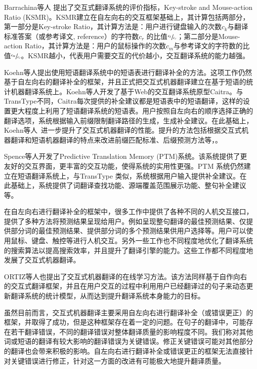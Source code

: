 \documentclass[master, winfont]{njuthesis}
\begin{document}
Barrachina等人\cite{barrachina2009statistical} 提出了交互式翻译系统的评价指标，Key-stroke and Mouse-action Ratio (KSMR)。KSMR建立在自左向右的交互框架基础上，其计算包括两部分，第一部分是Key-stroke Ratio，其计算方法是：用户进行键盘输入的次数$c_k$与翻译标准答案（或参考译文, reference）的字符数$c_r$ 的比值$\sfrac{c_k}{c_r}$；第二部分是Mouse-action Ratio，其计算方法是：用户的鼠标操作的次数$c_m$与参考译文的字符数的比值$\sfrac{c_m}{c_r}$。KSMR越小，代表用户需要交互的代价越小，交互翻译系统的能力越强。

Koehn等人\cite{koehn2009web}提出使用短语翻译系统中的短语表进行翻译补全的方法。这项工作仍然基于自左向右的翻译补全的框架，并且正式把交互式机器翻译建立在基于短语的统计机器翻译系统上。Koehn等人开发了基于Web的交互翻译系统原型Caitra。与TransType不同，Caitra每次提供的补全建议都是短语表中的短语翻译，这样的设置更大程度上利用了短语翻译系统的短语表。用户按照自左向右的顺序选择正确的翻译选项，系统根据输入前缀限制翻译路径的生成，生成补全建议。在此基础上，Koehn等人~\cite{koehnrefinements}进一步提升了交互式机器翻译的性能。提升的方法包括根据交互式机器翻译和短语机器翻译的特点来改进前缀匹配标准、后缀预测方法等，。

Spence等人\cite{green2014predictive}开发了Predictive Translation Memory (PTM)系统。该系统提供了更友好的交互界面，更丰富的交互功能，使得系统的实用性更强。PTM 系统仍然建立在短语翻译系统上，与TransType 类似，系统根据用户输入提供补全建议。在此基础上，系统提供了词翻译查找功能、源端覆盖范围展示功能、整句补全建议等。

在自左向右进行翻译补全的框架中，很多工作中提供了各种不同的人机交互接口，提供了多种方法将预测结果呈现给用户。例如呈现整句翻译的最佳预测结果、仅提供部分词的最佳预测结果、提供部分词的多个预测结果供用户选择等。用户可以使用鼠标、键盘、触控等进行人机交互\cite{langlais2000transtype,green2014predictive,koehn2009web,barrachina2009statistical}。另外一些工作\cite{och2003efficient,gonzalez2013interactive,sanchis2014efficient}也不同程度地优化了翻译系统的搜索算法以提高搜索效率，并且提升了翻译引擎的能力。这些工作都不同程度地发展了交互式机器翻译。

ORTIZ等人\cite{ortiz2010online}也提出了交互式机器翻译的在线学习方法。该方法同样基于自作向右的交互式翻译框架，并且在用户交互的过程中利用用户已经翻译过的句子来动态更新翻译系统的统计模型，从而达到提升翻译系统本身能力的目标。

虽然目前而言，交互式机器翻译主要采用自左向右进行翻译补全（或错误更正）的框架，并取得了成功，但是这种框架存在着一定的问题。在句子的翻译中，可能存在若干翻译错误，不同的翻译错误对整体翻译质量的影响程度不同。我们称对其他词或短语的翻译有较大影响的翻译错误为关键错误。修正关键错误可能对其他部分的翻译也会带来积极的影响。自左向右进行翻译补全或错误更正的框架无法直接针对关键错误进行修正，针对这一方面的改进有可能极大地提升翻译质量。
\end{document}

